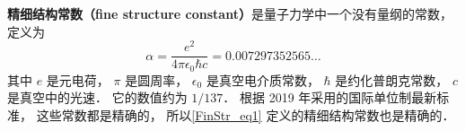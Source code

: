 
\textbf{精细结构常数（fine structure constant）}是量子力学中一个没有量纲的常数， 定义为
\begin{equation}\label{FinStr_eq1}
\alpha = \frac{e^2}{4\pi\epsilon_0\hbar c} = 0.007297352565\dots
\end{equation}
其中 $e$ 是元电荷， $\pi$ 是圆周率， $\epsilon_0$ 是真空电介质常数， $\hbar$ 是约化普朗克常数， $c$ 是真空中的光速． 它的数值约为 $1/137$． 根据 2019 年采用的国际单位制最新标准， 这些常数都是精确的， 所以\autoref{FinStr_eq1} 定义的精细结构常数也是精确的．
